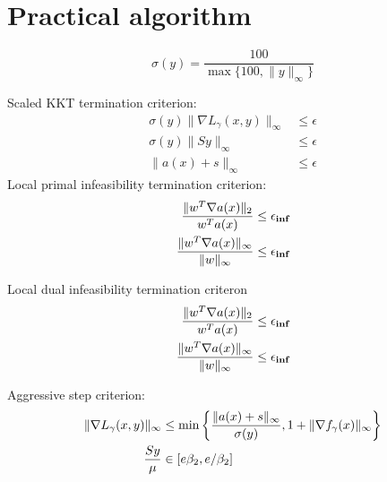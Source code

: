 \documentclass{article}
\begin{document}
\section{Practical algorithm}


$$
\sigma (y) = \frac{100}{\max\{ 100, \| y \|_{\infty} \}}
$$



Scaled KKT termination criterion: 
\begin{subequations}\label{terminate-kkt}
\begin{flalign}
\sigma (y) \| \nabla L_{\gamma}(x, y) \|_{\infty} &\le  \epsilon  \\
\sigma (y) \| S y \|_{\infty} &\le \epsilon  \\
\| a(x) + s \|_{\infty} &\le \epsilon 
\end{flalign}
\end{subequations}
Local primal infeasibility termination criterion:
\begin{subequations}\label{terminate-primal-infeasible}
\begin{flalign}
\frac{\| w^T \nabla a(x) \|_{2}}{w^T a(x)} \le \epsilon_{\textbf{inf}} \\
\frac{\| w^T \nabla a(x) \|_{\infty}}{\| w \|_{\infty}} \le \epsilon_{\textbf{inf}}
\end{flalign}
\end{subequations}

Local dual infeasibility termination criteron
\begin{subequations}\label{terminate-dual-infeasible}
\begin{flalign}
\frac{\| w^T \nabla a(x) \|_{2}}{w^T a(x)} \le \epsilon_{\textbf{inf}} \\
\frac{\| w^T \nabla a(x) \|_{\infty}}{\| w \|_{\infty}} \le \epsilon_{\textbf{inf}}
\end{flalign}
\end{subequations}

Aggressive step criterion:
\begin{subequations}\label{agg-criteron}
\begin{flalign}
\| \nabla L_{\gamma}(x, y) \|_{\infty} &\le \min\left\{ \frac{\| a(x) + s \|_{\infty}}{\sigma (y)  } , 1 + \| \nabla f_{\gamma}(x) \|_{\infty} \right\} \\
 \frac{S y}{\mu} &\in [ e \beta_{2}, e / \beta_{2} ] 
\end{flalign}
\end{subequations}
\end{document}
